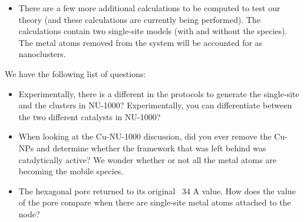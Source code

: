 \documentclass[journal=jctcce,manuscript=article]{achemso}
\begin{document}
\begin{itemize}
\begin{itemize}
        \item There are a few more additional calculations to be computed to test our theory (and these calculations are currently being performed). The calculations contain two single-site models (with and without the  species). The metal atoms removed from the system will be accounted for as nanoclusters.
    \end{itemize}
\end{itemize}
We have the following list of questions:
\begin{itemize}
    \item Experimentally, there is a different in the protocols to generate the single-site and the clusters in NU-1000? Experimentally, you can differentiate between the two different catalysts in NU-1000? 
    \item When looking at the Cu-NU-1000 discussion, did you ever remove the Cu-NPs and determine whether the framework that was left behind was catalytically active? We wonder whether or not all the metal atoms are becoming the mobile  species. 
    \item The hexagonal pore returned to its original ~34 A value. How does the value of the pore compare when there are single-site metal atoms attached to the node? 
\end{itemize}


\end{document}

